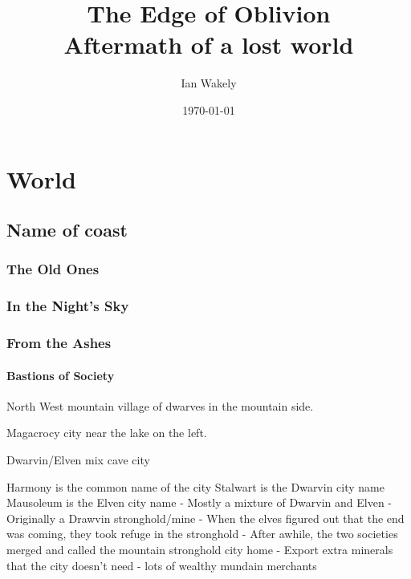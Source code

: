 \documentclass[letterpaper,twocolumn,openany,nodeprecatedcode]{dndbook}
\title{The Edge of Oblivion \\
\large Aftermath of a lost world}
\author{Ian Wakely}
\date{\today}
\begin{document}
\frontmatter

\maketitle

\tableofcontents

\mainmatter%

\part{World}

\chapter{Name of coast}

\section{The Old Ones}

\section{In the Night's Sky}

\section{From the Ashes}

\subsection{Bastions of Society}


North West mountain village of dwarves in the mountain side.


Magacrocy city near the lake on the left. 




Dwarvin/Elven mix cave city

Harmony is the common name of the city
Stalwart is the Dwarvin city name
Mausoleum is the Elven city name
- Mostly a mixture of Dwarvin and Elven
- Originally a Drawvin stronghold/mine
- When the elves figured out that the end was coming, they took refuge in the stronghold
- After awhile, the two societies merged and called the mountain stronghold city home
- Export extra minerals that the city doesn't need
- lots of wealthy mundain merchants
\end{document}
